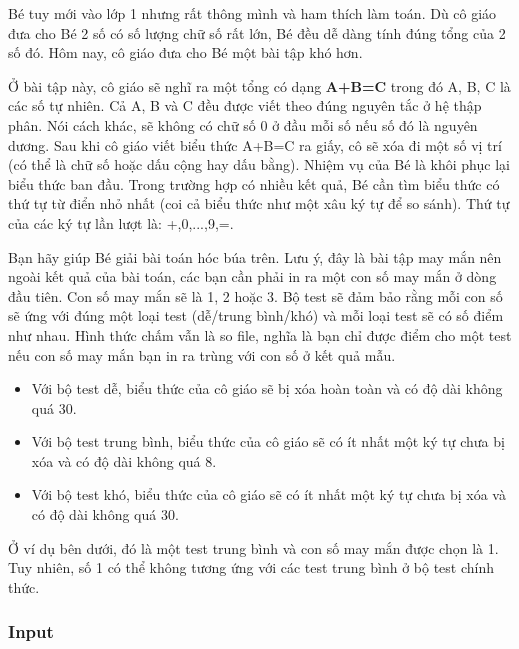 



   Bé tuy mới vào lớp 1 nhưng rất thông mình và ham thích làm toán. Dù cô giáo đưa cho Bé 2 số có số lượng chữ số rất lớn, Bé đều dễ dàng tính đúng tổng của 2 số đó. Hôm nay, cô giáo đưa cho Bé một bài tập khó hơn.  

   Ở bài tập này, cô giáo sẽ nghĩ ra một tổng có dạng   \textbf{    A+B=C   }   trong đó A, B, C là các số tự nhiên. Cả A, B và C đều được viết theo đúng nguyên tắc ở hệ thập phân. Nói cách khác, sẽ không có chữ số 0 ở đầu mỗi số nếu số đó là nguyên dương. Sau khi cô giáo viết biểu thức A+B=C ra giấy, cô sẽ xóa đi một số vị trí (có thể là chữ số hoặc dấu cộng hay dấu bằng). Nhiệm vụ của Bé là khôi phục lại biểu thức ban đầu. Trong trường hợp có nhiều kết quả, Bé cần tìm biểu thức có thứ tự từ điển nhỏ nhất (coi cả biểu thức như một xâu ký tự để so sánh). Thứ tự của các ký tự lần lượt là: +,0,...,9,=.  

   Bạn hãy giúp Bé giải bài toán hóc búa trên. Lưu ý, đây là bài tập may mắn nên ngoài kết quả của bài toán, các bạn cần phải in ra một con số may mắn ở dòng đầu tiên. Con số may mắn sẽ là 1, 2 hoặc 3. Bộ test sẽ đảm bảo rằng mỗi con số sẽ ứng với đúng một loại test (dễ/trung bình/khó) và mỗi loại test sẽ có số điểm như nhau. Hình thức chấm vẫn là so file, nghĩa là bạn chỉ được điểm cho một test nếu con số may mắn bạn in ra trùng với con số ở kết quả mẫu.  
\begin{itemize}
	\item     Với bộ test dễ, biểu thức của cô giáo sẽ bị xóa hoàn toàn và có độ dài không quá 30.   
\end{itemize}
\begin{itemize}
	\item     Với bộ test trung bình, biểu thức của cô giáo sẽ có ít nhất một ký tự chưa bị xóa và có độ dài không quá 8.   
\end{itemize}
\begin{itemize}
	\item     Với bộ test khó, biểu thức của cô giáo sẽ có ít nhất một ký tự chưa bị xóa và có độ dài không quá 30.   
\end{itemize}

   Ở ví dụ bên dưới, đó là một test trung bình và con số may mắn được chọn  là 1. Tuy nhiên, số 1 có thể không tương ứng với các test trung bình ở  bộ test chính thức.  

\subsubsection{   Input  }




